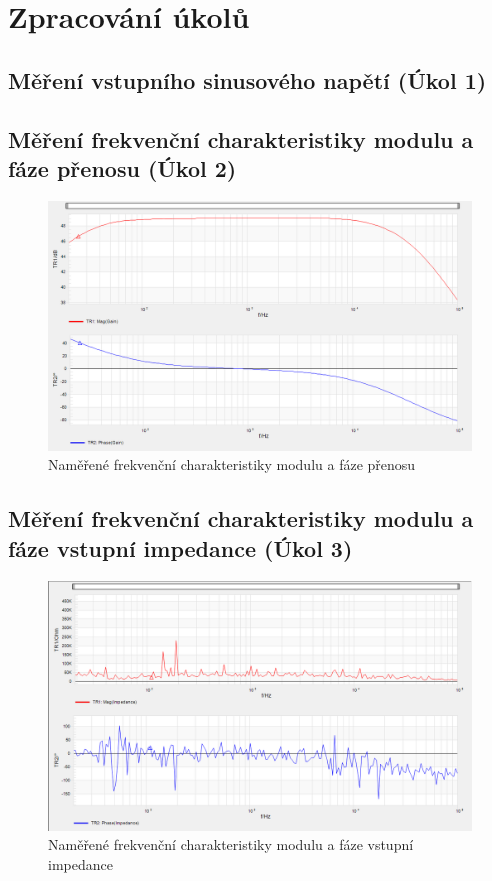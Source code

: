 \documentclass[a4paper, czech]{article}
\begin{document}
\section{Zpracování úkolů}

\subsection{Měření vstupního sinusového napětí (Úkol 1)}



\subsection{Měření frekvenční charakteristiky modulu a fáze přenosu (Úkol 2)}

\begin{figure}[H]
    \centering
    \includegraphics[width=\textwidth]{nkzt10_120324/nkzt10_2.png}
    \caption{Naměřené frekvenční charakteristiky modulu a fáze přenosu}
\end{figure}

\subsection{Měření frekvenční charakteristiky modulu a fáze vstupní impedance (Úkol 3)}

\begin{figure}[H]
    \centering
    \includegraphics[width=\textwidth]{nkzt10_120324/nkzt10_3.png}
    \caption{Naměřené frekvenční charakteristiky modulu a fáze vstupní impedance}
\end{figure}
\end{document}
